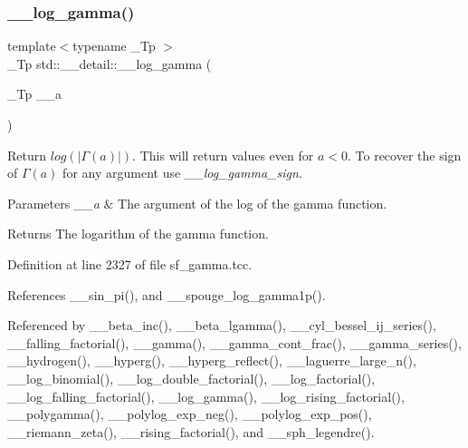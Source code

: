 \subsubsection{\texorpdfstring{\+\_\+\+\_\+log\+\_\+gamma()}{\_\_log\_gamma()}\hspace{0.1cm}{\footnotesize\ttfamily [1/2]}}
{\footnotesize\ttfamily template$<$typename \+\_\+\+Tp $>$ \\
\+\_\+\+Tp std\+::\+\_\+\+\_\+detail\+::\+\_\+\+\_\+log\+\_\+gamma (\begin{DoxyParamCaption}\item[{\+\_\+\+Tp}]{\+\_\+\+\_\+a }\end{DoxyParamCaption})}



Return $ log(|\Gamma(a)|) $. This will return values even for $ a < 0 $. To recover the sign of $ \Gamma(a) $ for any argument use {\itshape \+\_\+\+\_\+log\+\_\+gamma\+\_\+sign}. 


\begin{DoxyParams}{Parameters}
{\em \+\_\+\+\_\+a} & The argument of the log of the gamma function. \\
\hline
\end{DoxyParams}
\begin{DoxyReturn}{Returns}
The logarithm of the gamma function. 
\end{DoxyReturn}


Definition at line 2327 of file sf\+\_\+gamma.\+tcc.



References \+\_\+\+\_\+sin\+\_\+pi(), and \+\_\+\+\_\+spouge\+\_\+log\+\_\+gamma1p().



Referenced by \+\_\+\+\_\+beta\+\_\+inc(), \+\_\+\+\_\+beta\+\_\+lgamma(), \+\_\+\+\_\+cyl\+\_\+bessel\+\_\+ij\+\_\+series(), \+\_\+\+\_\+falling\+\_\+factorial(), \+\_\+\+\_\+gamma(), \+\_\+\+\_\+gamma\+\_\+cont\+\_\+frac(), \+\_\+\+\_\+gamma\+\_\+series(), \+\_\+\+\_\+hydrogen(), \+\_\+\+\_\+hyperg(), \+\_\+\+\_\+hyperg\+\_\+reflect(), \+\_\+\+\_\+laguerre\+\_\+large\+\_\+n(), \+\_\+\+\_\+log\+\_\+binomial(), \+\_\+\+\_\+log\+\_\+double\+\_\+factorial(), \+\_\+\+\_\+log\+\_\+factorial(), \+\_\+\+\_\+log\+\_\+falling\+\_\+factorial(), \+\_\+\+\_\+log\+\_\+gamma(), \+\_\+\+\_\+log\+\_\+rising\+\_\+factorial(), \+\_\+\+\_\+polygamma(), \+\_\+\+\_\+polylog\+\_\+exp\+\_\+neg(), \+\_\+\+\_\+polylog\+\_\+exp\+\_\+pos(), \+\_\+\+\_\+riemann\+\_\+zeta(), \+\_\+\+\_\+rising\+\_\+factorial(), and \+\_\+\+\_\+sph\+\_\+legendre().

